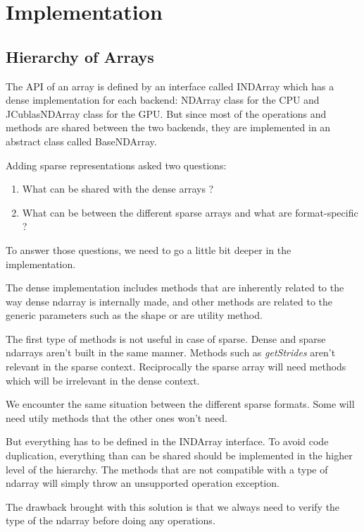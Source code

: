 \chapter{Implementation}


\section{Hierarchy of Arrays}

The API of an array is defined by an interface called INDArray which has a dense implementation for each backend: NDArray class for the CPU and JCublasNDArray class for the GPU. But since most of the operations and methods are shared between the two backends, they are implemented in an abstract class called BaseNDArray.

Adding sparse representations asked two questions:
\begin{enumerate}
 	\item What can be shared with the dense arrays ?
	\item What can be between the different sparse arrays and what are format-specific ?
\end{enumerate}

To answer those questions, we need to go a little bit deeper in the implementation. 

The dense implementation includes methods that are inherently related to the way dense ndarray is internally made, and other methods are related to the generic parameters such as the shape or are utility method.

The first type of methods is not useful in case of sparse. Dense and sparse ndarrays aren't built in the same manner. Methods such as \textit{getStrides} aren't relevant in the sparse context. Reciprocally the sparse array will need methods which will be irrelevant in the dense context.

We encounter the same situation between the different sparse formats. Some will need utily methods that the other ones won't need.

But everything has to be defined in the INDArray interface. To avoid code duplication, everything than can be shared should be implemented in the higher level of the hierarchy. The methods that are not compatible with a type of ndarray will simply throw an unsupported operation exception.

The drawback brought with this solution is that we always need to verify the type of the ndarray before doing any operations.

